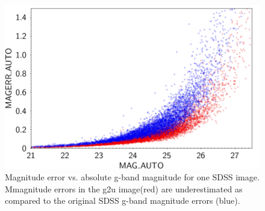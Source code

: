 \documentclass[apj,iop]{emulateapj}
\begin{document}
\begin{figure}
\begin{minipage}{\columnwidth}
\includegraphics[width=\columnwidth,height=0.28\textheight]{figures/figure_magerr_corr_gband_example_uncorr.png}
\caption{Magnitude error vs. absolute g-band magnitude for one SDSS image. Mmagnitude errors in the g2u image(red) are underestimated as compared to the original SDSS g-band magnitude errors (blue).}
\label{fig:magerr_corr_example}
\end{minipage}
\end{figure}
\end{document}
